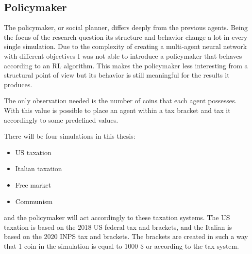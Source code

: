 \subsection{Policymaker}

The policymaker, or social planner, differs deeply from the previous agents. Being the focus of the research question its structure and behavior change a lot in every single simulation. Due to the complexity of creating a multi-agent neural network with different objectives I was not able to introduce a policymaker that behaves according to an RL algorithm. This makes the policymaker less interesting from a structural point of view but its behavior is still meaningful for the results it produces.

The only observation needed is the number of coins that each agent possesses. With this value is possible to place an agent within a tax bracket and tax it accordingly to some predefined values. 

There will be four simulations in this thesis: 

\begin{itemize}
    \item US taxation
    \item Italian taxation
    \item Free market
    \item Communism
\end{itemize}

and the policymaker will act accordingly to these taxation systems. The US taxation is based on the 2018 US federal tax and brackets, and the Italian is based on the 2020 INPS tax and brackets. The brackets are created in such a way that 1 coin in the simulation is equal to 1000 \$ or   according to the tax system.  